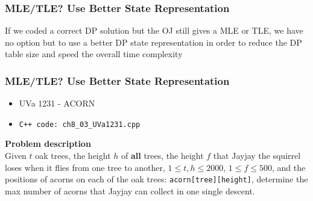 \documentclass{beamer}
\begin{document}
\begin{frame}[fragile]
\frametitle{MLE/TLE? Use Better State Representation}

If we coded a correct DP solution but the OJ still gives a MLE or TLE, we have no option but to use a better DP state representation in order to reduce the DP table size and speed the overall time complexity

\end{frame}

\begin{frame}[fragile]
\frametitle{MLE/TLE? Use Better State Representation}

\begin{itemize}
    \item \color{blue}UVa 1231 - ACORN\color{black}
    \item \color{red}\verb|C++ code: ch8_03_UVa1231.cpp|\color{black}
\end{itemize}

\vspace{0.3cm}

\color{red}\textbf{Problem description}\color{black} \\

Given $t$ oak trees, the height $h$ of \textbf{all} trees, the height $f$ that Jayjay the squirrel loses when it flies from one tree to another, $1 \leq t,h \leq 2000$, $1 \leq f \leq 500$, and the positions of acorns on each of the oak trees: \verb|acorn[tree][height]|, determine the max number of acorns that Jayjay can collect in one single descent. 

\end{frame}
\end{document}
